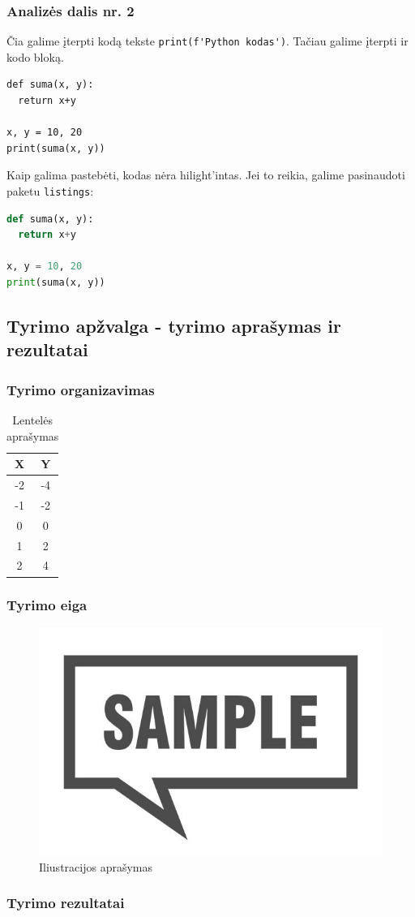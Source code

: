 \subsubsection{Analizės dalis nr. 2}
\lipsum[4]
Čia galime įterpti kodą tekste \verb|print(f'Python kodas')|. Tačiau galime įterpti ir kodo bloką.
\begin{verbatim}
def suma(x, y):
  return x+y
  
x, y = 10, 20
print(suma(x, y))
\end{verbatim}
Kaip galima pastebėti, kodas nėra hilight'intas. Jei to reikia, \newline galime pasinaudoti paketu \verb|listings|:
\begin{lstlisting}[language=Python, caption=Pavyzdinis kodas]
def suma(x, y):
  return x+y
  
x, y = 10, 20
print(suma(x, y))
\end{lstlisting}

\subsection{Tyrimo apžvalga - tyrimo aprašymas ir rezultatai}
\subsubsection{Tyrimo organizavimas}
\lipsum[5]
\begin{table}[H]
    \centering
    \begin{tabular}{|c|c|}
        \hline
        \textbf{X} & \textbf{Y} \\
        \hline
        -2 & -4 \\
        -1 & -2 \\
        0 & 0 \\
        1 & 2 \\
        2 & 4 \\
        \hline
    \end{tabular}
    \caption{Lentelės aprašymas}
    \label{tab:laikina_lentele}
\end{table}
\subsubsection{Tyrimo eiga}
\lipsum[4]
\begin{figure}[H]
    \centering
    \includegraphics{media/sample-img}
    \caption{Iliustracijos aprašymas}
    \label{fig:laikina_iliustracija_2}
\end{figure}
\subsubsection{Tyrimo rezultatai}
\lipsum[5]